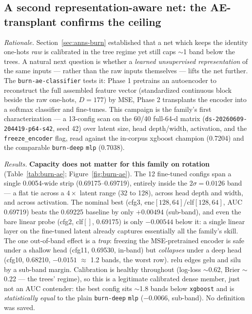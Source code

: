\documentclass[11pt]{article}
\newcommand{\dsid}[1]{\texttt{\small #1}}
\begin{document}
\subsection{A second representation-aware net: the AE-transplant confirms the ceiling}
\label{sec:anns-ae}
\emph{Rationale.} Section~\ref{sec:anns-burn} established that a net which keeps
the identity one-hots \emph{raw} is calibrated in the tree regime yet still caps
$\sim$1 band below the trees. A natural next question is whether a \emph{learned
unsupervised representation} of the same inputs --- rather than the raw inputs
themselves --- lifts the net further. The \texttt{burn-ae-classifier} tests it:
Phase 1 pretrains an autoencoder to reconstruct the full assembled feature
vector (standardized continuous block beside the raw one-hots, $D{=}177$) by
MSE, Phase 2 transplants the encoder into a softmax classifier and fine-tunes.
This campaign is the family's first characterization --- a 13-config scan on the
60/40 full-64-d matrix (\dsid{ds-20260609-204419-p64-s42}, seed 42) over latent
size, head depth/width, activation, and the \texttt{freeze\_encoder} flag, read
against the in-corpus xgboost champion (\num{0.7204}) and the comparable
\texttt{burn-deep} \texttt{mlp} (\num{0.7038}).

\emph{Results.} \textbf{Capacity does not matter for this family on rotation}
(Table~\ref{tab:burn-ae}; Figure~\ref{fig:burn-ae}). The 12 fine-tuned configs
span a single \num{0.0054}-wide strip (\num{0.69175}--\num{0.69719}), entirely
inside the $2\sigma=0.0126$ band --- a flat tie across a $4\times$ latent range
(32 to 128), across head depth and width, and across activation. The nominal
best (cfg3, enc$[128,64]$/clf$[128,64]$, AUC \num{0.69719}) beats the
\num{0.69225} baseline by only $+0.00494$ (sub-band), and even the bare linear
probe (cfg2, clf$[]$, \num{0.69175}) is only $-0.00544$ below it: a single linear
layer on the fine-tuned latent already captures essentially all the family's
skill. The one out-of-band effect is a \emph{trap}: freezing the MSE-pretrained
encoder is safe under a shallow head (cfg11, \num{0.69530}, in-band) but
\emph{collapses} under a deep head (cfg10, \num{0.68210}, $-0.0151$ $\approx$
1.2 bands, the worst row). relu edges gelu and silu by a sub-band margin.
Calibration is healthy throughout (log-loss $\sim$0.62, Brier $\sim$0.22 --- the
trees' regime), so this is a legitimate calibrated dense member, just not an AUC
contender: the best config sits $\sim$1.8 bands below \texttt{xgboost} and is
\emph{statistically equal} to the plain \texttt{burn-deep} \texttt{mlp}
($-0.0066$, sub-band). No definition was saved.
\end{document}
